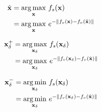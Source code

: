 \documentclass[fleqn]{article} %
\begin{document}
\setlength{\mathindent}{1.0ex}
\begin{minipage}[c]{0.33\textwidth}
\begin{align}
\hat{\bf{x}} &= \underset{\bf{x}} {\arg\max} \ f_s(\bf{x}) \label{eq:O1} \\
&= \underset{\bf{x}}{\arg\max} \ e^{-\left\|f_v({\bf{x}})-f_v(\tilde{\bf{x}})\right\|} \label{eq:O2}
\end{align}
\end{minipage}
\begin{minipage}[c]{0.33\textwidth}
\begin{align}
\bf{x}^{+}_{\delta} &= \underset{\bf{x}_{\delta}}{\arg\max} \ f_s(\bf{x}_{\delta}) \label{eq:I1} \\
&= \underset{\bf{x}_{\delta}}{\arg\max} \ e^{-\left\|f_v({\bf{x}}_{\delta})-f_v(\hat{\bf{x}})\right\|} \label{eq:I2}
\end{align}
\end{minipage}
\begin{minipage}[c]{0.33\textwidth}
\begin{align}
\bf{x}^{-}_{\delta} &= \underset{\bf{x}_{\delta}}{\arg\min} \ f_s(\bf{x}_{\delta}) \label{eq:S1} \\
&= \underset{\bf{x}_{\delta}}{\arg\min} \ e^{-\left\|f_v({\bf{x}}_{\delta})-f_v(\hat{\bf{x}})\right\|} \label{eq:S2}
\end{align}
\end{minipage}

\newcommand{\expconst}{We restrict the space of stimuli considered with a constant energy constraint $\left\| \bf{x} \right\| = E$, where $E$ in all mathematical derivations is set to $1$ for simplicity, but in our experiments, set to the average energy of task-related images. This avoids degenerate solutions that simply maximize stimulus contrasts.}
\end{document}
